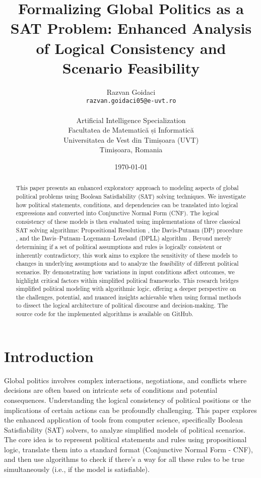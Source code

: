 \documentclass[11pt, a4paper]{article}
\title{Formalizing Global Politics as a SAT Problem: Enhanced Analysis of Logical Consistency and Scenario Feasibility}
\author{
    Razvan Goidaci \\
    \texttt{razvan.goidaci05@e-uvt.ro} \\ \\
    Artificial Intelligence Specialization \\
    Facultatea de Matematică și Informatică \\
    Universitatea de Vest din Timișoara (UVT) \\
    Timișoara, Romania
}
\date{\today}
\begin{document}
\maketitle

\begin{abstract}
This paper presents an enhanced exploratory approach to modeling aspects of global political problems using Boolean Satisfiability (SAT) solving techniques. We investigate how political statements, conditions, and dependencies can be translated into logical expressions and converted into Conjunctive Normal Form (CNF). The logical consistency of these models is then evaluated using implementations of three classical SAT solving algorithms: Propositional Resolution \cite{Robinson1965}, the Davis-Putnam (DP) procedure \cite{DavisPutnam1960}, and the Davis–Putnam–Logemann–Loveland (DPLL) algorithm \cite{DPLL1962}. Beyond merely determining if a set of political assumptions and rules is logically consistent or inherently contradictory, this work aims to explore the sensitivity of these models to changes in underlying assumptions and to analyze the feasibility of different political scenarios. By demonstrating how variations in input conditions affect outcomes, we highlight critical factors within simplified political frameworks. This research bridges simplified political modeling with algorithmic logic, offering a deeper perspective on the challenges, potential, and nuanced insights achievable when using formal methods to dissect the logical architecture of political discourse and decision-making. The source code for the implemented algorithms is available on GitHub.
\end{abstract}

\section{Introduction}

Global politics involves complex interactions, negotiations, and conflicts where decisions are often based on intricate sets of conditions and potential consequences. Understanding the logical consistency of political positions or the implications of certain actions can be profoundly challenging. This paper explores the enhanced application of tools from computer science, specifically Boolean Satisfiability (SAT) solvers, to analyze simplified models of political scenarios. The core idea is to represent political statements and rules using propositional logic, translate them into a standard format (Conjunctive Normal Form - CNF), and then use algorithms to check if there's a way for all these rules to be true simultaneously (i.e., if the model is satisfiable).
\end{document}
